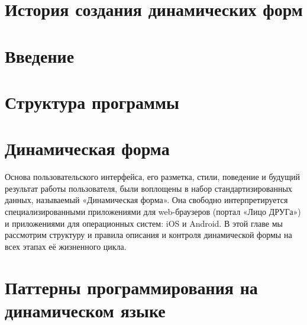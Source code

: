 \documentclass[14pt]{extbook}
\begin{document}
		
 	\pagestyle{empty} 
    
    \mainmatter
    \tableofcontents
	
	\pagestyle{fancy} 
	\fancyhead[RE]{\leftmark}
	\fancyhead[LE]{\thepage}
	\fancyhead[LO]{\rightmark}
	\fancyhead[RO]{\thepage}
	\fancyfoot[]{}

	\setcounter{secnumdepth}{0}
	
    \chapter{История создания динамических форм}
    
    
    \setcounter{secnumdepth}{1}
    
	\chapter{Введение}
    
   	
	\chapter{Структура программы}
    

	\chapter{Динамическая форма}\label{sec:dynfom}
	Основа пользовательского интерфейса, его разметка, стили, поведение и будущий результат работы пользователя,
	были воплощены в набор стандартизированных данных, называемый «Динамическая форма». Она свободно интерпретируется
	специализированными приложениями для web-браузеров (портал «Лицо ДРУГа») и приложениями для операционных систем:
	iOS и Android. В этой главе мы рассмотрим структуру и правила описания и контроля динамической формы
	на всех этапах её жизненного цикла.
	
    
    
    

	\chapter{Паттерны программирования на динамическом языке}
    
    
\end{document}
